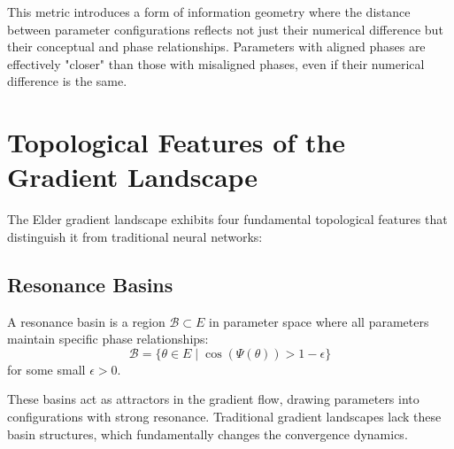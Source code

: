 This metric introduces a form of information geometry where the distance between parameter configurations reflects not just their numerical difference but their conceptual and phase relationships. Parameters with aligned phases are effectively "closer" than those with misaligned phases, even if their numerical difference is the same.

\section{Topological Features of the Gradient Landscape}

The Elder gradient landscape exhibits four fundamental topological features that distinguish it from traditional neural networks:

\subsection{Resonance Basins}

\begin{definition}
A resonance basin is a region $\mathcal{B} \subset E$ in parameter space where all parameters maintain specific phase relationships:
\begin{equation}
\mathcal{B} = \{\theta \in E \mid \cos(\Psi(\theta)) > 1 - \epsilon\}
\end{equation}
for some small $\epsilon > 0$.
\end{definition}

These basins act as attractors in the gradient flow, drawing parameters into configurations with strong resonance. Traditional gradient landscapes lack these basin structures, which fundamentally changes the convergence dynamics.

